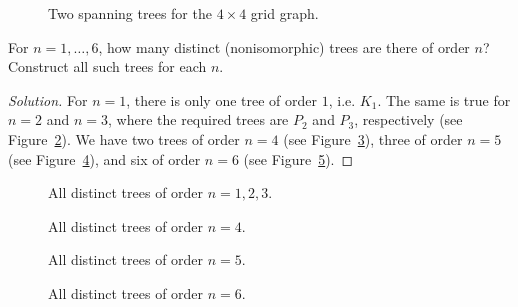 \begin{figure}[!htbp]
\centering

\caption{Two spanning trees for the $4 \times 4$ grid graph.}
\label{fig:trees_forests:grid_graph_spanning_trees}
\end{figure}

\begin{example}
For $n = 1, \dots, 6$, how many distinct (nonisomorphic) trees are
there of order $n$? Construct all such trees for each $n$.
\end{example}

\begin{proof}[Solution]
For $n = 1$, there is only one tree of order $1$, i.e. $K_1$. The same
is true for $n = 2$ and $n = 3$, where the required trees are $P_2$
and $P_3$, respectively (see
Figure~\ref{fig:trees_forests:distinct_trees_specified_order_1_2_3}). We
have two trees of order $n = 4$ (see
Figure~\ref{fig:trees_forests:distinct_trees_specified_order_4}),
three of order $n = 5$ (see
Figure~\ref{fig:trees_forests:distinct_trees_specified_order_5}), and
six of order $n = 6$ (see
Figure~\ref{fig:trees_forests:distinct_trees_specified_order_6}).
\end{proof}

\begin{figure}[!htbp]
\centering

\caption{All distinct trees of order $n = 1, 2, 3$.}
\label{fig:trees_forests:distinct_trees_specified_order_1_2_3}
\end{figure}

\begin{figure}[!htbp]
\centering

\caption{All distinct trees of order $n = 4$.}
\label{fig:trees_forests:distinct_trees_specified_order_4}
\end{figure}

\begin{figure}[!htbp]
\centering

\caption{All distinct trees of order $n = 5$.}
\label{fig:trees_forests:distinct_trees_specified_order_5}
\end{figure}

\begin{figure}[!htbp]
\centering

\caption{All distinct trees of order $n = 6$.}
\label{fig:trees_forests:distinct_trees_specified_order_6}
\end{figure}

